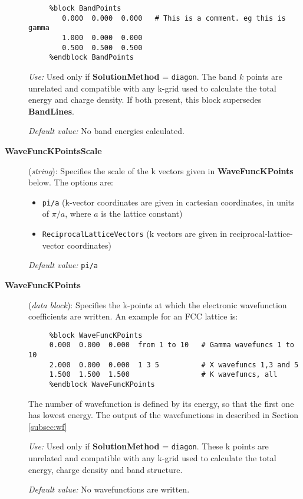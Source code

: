 \documentclass[11pt]{article}
\begin{document}
\begin{description}
\begin{verbatim}
     %block BandPoints
        0.000  0.000  0.000   # This is a comment. eg this is gamma
        1.000  0.000  0.000 
        0.500  0.500  0.500   
     %endblock BandPoints
\end{verbatim}

{\it Use:} Used only if {\bf SolutionMethod} = {\tt diagon}.
The band $k$ points are unrelated and compatible with any k-grid used
to calculate the total energy and charge density. If both present, this 
block supersedes {\bf BandLines}.

{\it Default value:} No band energies calculated.

\item[{\bf WaveFuncKPointsScale}] ({\it string}): 
Specifies the scale of the k vectors given in 
{\bf WaveFuncKPoints} below.
The options are:
\begin{itemize}
\item {\tt pi/a} (k-vector coordinates are given in cartesian 
coordinates, in units of $\pi/a$, where $a$ is the lattice constant)
\item {\tt ReciprocalLatticeVectors} (k vectors are given in
reciprocal-lattice-vector coordinates)
\end{itemize}

{\it Default value:} {\tt pi/a}


\item[{\bf WaveFuncKPoints}] ({\it data block}): 
Specifies the k-points at which the electronic wavefunction
coefficients are written. 
An example for an FCC lattice is:

\begin{verbatim}
     %block WaveFuncKPoints              
     0.000  0.000  0.000  from 1 to 10   # Gamma wavefuncs 1 to 10
     2.000  0.000  0.000  1 3 5          # X wavefuncs 1,3 and 5
     1.500  1.500  1.500                 # K wavefuncs, all
     %endblock WaveFuncKPoints
\end{verbatim}

The number of wavefunction is defined by its energy, so that the
first one has lowest energy.
The output of the wavefunctions in described in Section \ref{subsec:wf}

{\it Use:} Used only if {\bf SolutionMethod} = {\tt diagon}.
These k points are unrelated and compatible with any k-grid used
to calculate the total energy,  charge density and band structure.

{\it Default value:} No wavefunctions are written.

\end{description}
\end{document}
